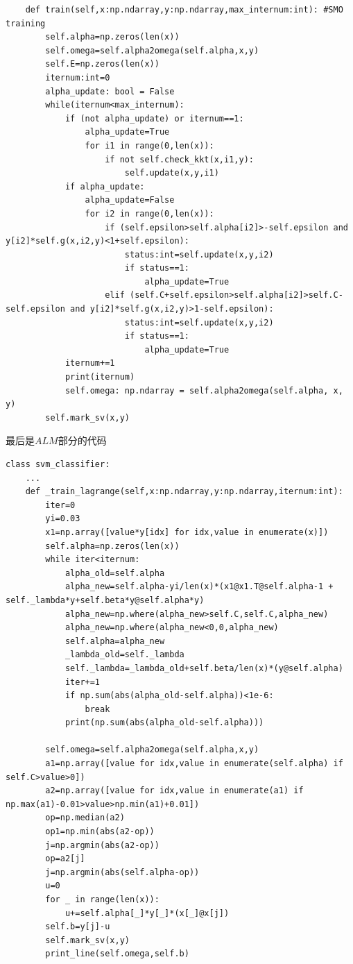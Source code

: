 \documentclass{article}
\begin{document}
\begin{verbatim}
    def train(self,x:np.ndarray,y:np.ndarray,max_internum:int): #SMO training
        self.alpha=np.zeros(len(x))
        self.omega=self.alpha2omega(self.alpha,x,y)
        self.E=np.zeros(len(x))
        iternum:int=0
        alpha_update: bool = False
        while(iternum<max_internum):
            if (not alpha_update) or iternum==1:
                alpha_update=True
                for i1 in range(0,len(x)):
                    if not self.check_kkt(x,i1,y):
                        self.update(x,y,i1)
            if alpha_update:
                alpha_update=False
                for i2 in range(0,len(x)):
                    if (self.epsilon>self.alpha[i2]>-self.epsilon and y[i2]*self.g(x,i2,y)<1+self.epsilon):
                        status:int=self.update(x,y,i2)
                        if status==1:
                            alpha_update=True
                    elif (self.C+self.epsilon>self.alpha[i2]>self.C-self.epsilon and y[i2]*self.g(x,i2,y)>1-self.epsilon):
                        status:int=self.update(x,y,i2)
                        if status==1:
                            alpha_update=True
            iternum+=1
            print(iternum)
            self.omega: np.ndarray = self.alpha2omega(self.alpha, x, y)
        self.mark_sv(x,y)
\end{verbatim}

\noindent 最后是$ALM$部分的代码
\begin{verbatim}
class svm_classifier:
    ...
    def _train_lagrange(self,x:np.ndarray,y:np.ndarray,iternum:int):
        iter=0
        yi=0.03
        x1=np.array([value*y[idx] for idx,value in enumerate(x)])
        self.alpha=np.zeros(len(x))
        while iter<iternum:
            alpha_old=self.alpha
            alpha_new=self.alpha-yi/len(x)*(x1@x1.T@self.alpha-1 + self._lambda*y+self.beta*y@self.alpha*y)
            alpha_new=np.where(alpha_new>self.C,self.C,alpha_new)
            alpha_new=np.where(alpha_new<0,0,alpha_new)
            self.alpha=alpha_new
            _lambda_old=self._lambda
            self._lambda=_lambda_old+self.beta/len(x)*(y@self.alpha)
            iter+=1
            if np.sum(abs(alpha_old-self.alpha))<1e-6:
                break
            print(np.sum(abs(alpha_old-self.alpha)))

        self.omega=self.alpha2omega(self.alpha,x,y)
        a1=np.array([value for idx,value in enumerate(self.alpha) if self.C>value>0])
        a2=np.array([value for idx,value in enumerate(a1) if np.max(a1)-0.01>value>np.min(a1)+0.01])
        op=np.median(a2)
        op1=np.min(abs(a2-op))
        j=np.argmin(abs(a2-op))
        op=a2[j]
        j=np.argmin(abs(self.alpha-op))
        u=0
        for _ in range(len(x)):
            u+=self.alpha[_]*y[_]*(x[_]@x[j])
        self.b=y[j]-u
        self.mark_sv(x,y)
        print_line(self.omega,self.b)
\end{verbatim}
\end{document}

